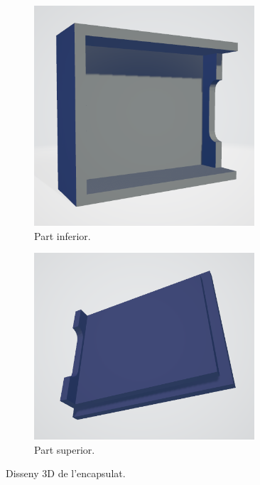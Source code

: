\begin{figure}[ht]
    \centering
    \begin{subfigure}{0.40\textwidth}
        \centering
        \includegraphics[width=0.9\textwidth]{images/freecad/3d_bottom.png}
        \caption{Part inferior.}
        \label{fig:3d_freecad_bottom}
    \end{subfigure}
    \begin{subfigure}{0.4\textwidth}
        \centering
        \includegraphics[width=0.9\textwidth]{images/freecad/3d_top.png}
        \caption{Part superior.}
        \label{fig:3d_freecad_top}
    \end{subfigure}
    \caption{Disseny 3D de l'encapsulat.}
    \label{fig:3d_freecad}
\end{figure}

